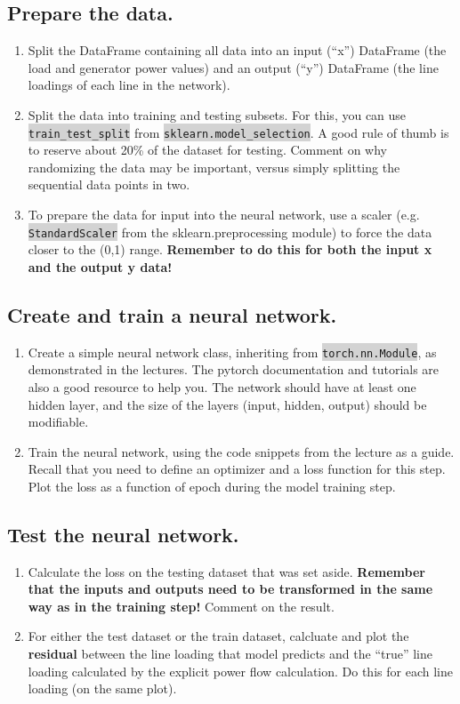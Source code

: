 \documentclass[11pt]{article}
\newcommand{\code}[1]{\colorbox{lightgray}{\texttt{#1}}}
\begin{document}
\subsection{Prepare the data.}

\begin{enumerate}
\item Split the DataFrame containing all data into an input (``x'') DataFrame (the load and generator
  power values) and an output (``y'') DataFrame (the line loadings of each line in the network).
\item Split the data into training and testing subsets. For this, you can use \code{train\_test\_split} from \code{sklearn.model\_selection}.
  A good rule of thumb is to reserve about 20\% of the dataset for testing. Comment on why randomizing the data may be important, versus simply
  splitting the sequential data points in two.
\item To prepare the data for input into the neural network, use a scaler
  (e.g. \code{StandardScaler} from the sklearn.preprocessing module) to force the data closer to
  the (0,1) range. \textbf{Remember to do this for both the input x and the output y data!}
\end{enumerate}

\subsection{Create and train a neural network.}

\begin{enumerate}
\item Create a simple neural network class, inheriting from \code{torch.nn.Module},
  as demonstrated in the lectures. The pytorch documentation and tutorials are also
  a good resource to help you.
  The network should have at least one hidden layer, and the
  size of the layers (input, hidden, output) should be modifiable.
\item Train the neural network, using the code snippets from the lecture as a guide. Recall
  that you need to define an optimizer and a loss function for this step. Plot the loss
  as a function of epoch during the model training step.
\end{enumerate}

\subsection{Test the neural network.}

\begin{enumerate}
\item Calculate the loss on the testing dataset that was set aside.
  \textbf{Remember that the inputs and outputs need to be transformed in the same way as in the training step!}
  Comment on the result.
\item For either the test dataset or the train dataset, calcluate and plot the {\textbf{residual}}
  between the line loading that model predicts and the ``true'' line loading calculated
  by the explicit power flow calculation. Do this for each line loading (on the same plot).
\end{enumerate}
\end{document}
